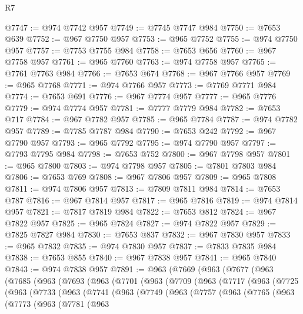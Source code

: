 \begin{lexlean}{R7}
\begin{coremodule}
@7747 := @974 @7742 @957
@7749 := @7745 @7747 @984
@7750 := @7653 @639
@7752 := @967 @7750 @957
@7753 := @965 @7752
@7755 := @974 @7750 @957
@7757 := @7753 @7755 @984
@7758 := @7653 @656
@7760 := @967 @7758 @957
@7761 := @965 @7760
@7763 := @974 @7758 @957
@7765 := @7761 @7763 @984
@7766 := @7653 @674
@7768 := @967 @7766 @957
@7769 := @965 @7768
@7771 := @974 @7766 @957
@7773 := @7769 @7771 @984
@7774 := @7653 @691
@7776 := @967 @7774 @957
@7777 := @965 @7776
@7779 := @974 @7774 @957
@7781 := @7777 @7779 @984
@7782 := @7653 @717
@7784 := @967 @7782 @957
@7785 := @965 @7784
@7787 := @974 @7782 @957
@7789 := @7785 @7787 @984
@7790 := @7653 @242
@7792 := @967 @7790 @957
@7793 := @965 @7792
@7795 := @974 @7790 @957
@7797 := @7793 @7795 @984
@7798 := @7653 @752
@7800 := @967 @7798 @957
@7801 := @965 @7800
@7803 := @974 @7798 @957
@7805 := @7801 @7803 @984
@7806 := @7653 @769
@7808 := @967 @7806 @957
@7809 := @965 @7808
@7811 := @974 @7806 @957
@7813 := @7809 @7811 @984
@7814 := @7653 @787
@7816 := @967 @7814 @957
@7817 := @965 @7816
@7819 := @974 @7814 @957
@7821 := @7817 @7819 @984
@7822 := @7653 @812
@7824 := @967 @7822 @957
@7825 := @965 @7824
@7827 := @974 @7822 @957
@7829 := @7825 @7827 @984
@7830 := @7653 @837
@7832 := @967 @7830 @957
@7833 := @965 @7832
@7835 := @974 @7830 @957
@7837 := @7833 @7835 @984
@7838 := @7653 @855
@7840 := @967 @7838 @957
@7841 := @965 @7840
@7843 := @974 @7838 @957
@7891 := @963
    (@7669
      (@963
        (@7677
          (@963
            (@7685
              (@963
                (@7693
                  (@963
                    (@7701
                      (@963
                        (@7709
                          (@963
                            (@7717
                              (@963
                                (@7725
                                  (@963
                                    (@7733
                                      (@963
                                        (@7741
                                          (@963
                                            (@7749
                                              (@963
                                                (@7757
                                                  (@963
                                                    (@7765
                                                      (@963
                                                        (@7773
                                                          (@963
                                                            (@7781
                                                              (@963

\end{coremodule}
\end{lexlean}
